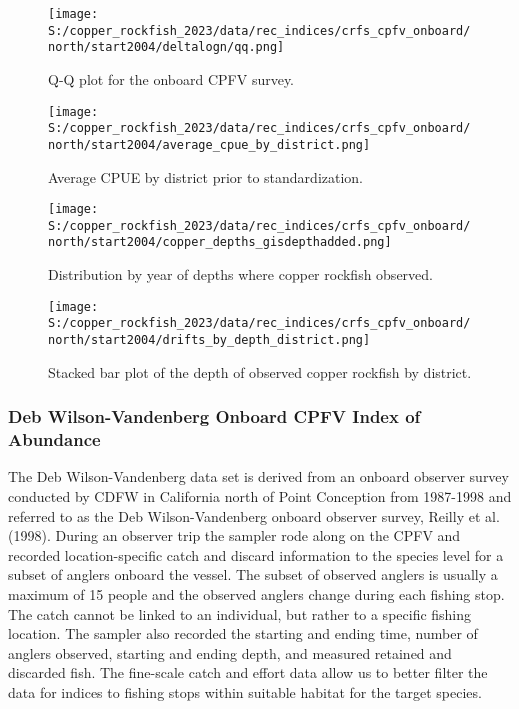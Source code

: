 \documentclass[11pt,
  english,
  letterpaper,
]{article}
\begin{document}
\newpage

\begin{figure}
\centering
\texttt{[image: S:/copper\_rockfish\_2023/data/rec\_indices/crfs\_cpfv\_onboard/north/start2004/deltalogn/qq.png]}
\caption{Q-Q plot for the onboard CPFV survey.\label{fig:onboard-qq}}
\end{figure}

\newpage

\begin{figure}
\centering
\texttt{[image: S:/copper\_rockfish\_2023/data/rec\_indices/crfs\_cpfv\_onboard/north/start2004/average\_cpue\_by\_district.png]}
\caption{Average CPUE by district prior to standardization.\label{fig:onboard-regioncpue}}
\end{figure}

\newpage

\begin{figure}
\centering
\texttt{[image: S:/copper\_rockfish\_2023/data/rec\_indices/crfs\_cpfv\_onboard/north/start2004/copper\_depths\_gisdepthadded.png]}
\caption{Distribution by year of depths where copper rockfish observed.\label{fig:onboard-depths}}
\end{figure}

\newpage

\begin{figure}
\centering
\texttt{[image: S:/copper\_rockfish\_2023/data/rec\_indices/crfs\_cpfv\_onboard/north/start2004/drifts\_by\_depth\_district.png]}
\caption{Stacked bar plot of the depth of observed copper rockfish by district.\label{fig:onboard-depths}}
\end{figure}

\newpage

\hypertarget{dwv-cpfv-index}{%
\subsubsection{Deb Wilson-Vandenberg Onboard CPFV Index of Abundance}\label{dwv-cpfv-index}}

The Deb Wilson-Vandenberg data set is derived from an onboard observer survey conducted by CDFW in California north of Point Conception from 1987-1998 and referred to as the Deb Wilson-Vandenberg onboard observer survey, Reilly et al. (1998). During an observer trip the sampler rode along on the CPFV and recorded location-specific catch and discard information to the species level for a subset of anglers onboard the vessel. The subset of observed anglers is usually a maximum of 15 people and the observed anglers change during each fishing stop. The catch cannot be linked to an individual, but rather to a specific fishing location. The sampler also recorded the starting and ending time, number of anglers observed, starting and ending depth, and measured retained and discarded fish. The fine-scale catch and effort data allow us to better filter the data for indices to fishing stops within suitable habitat for the target species.
\end{document}
